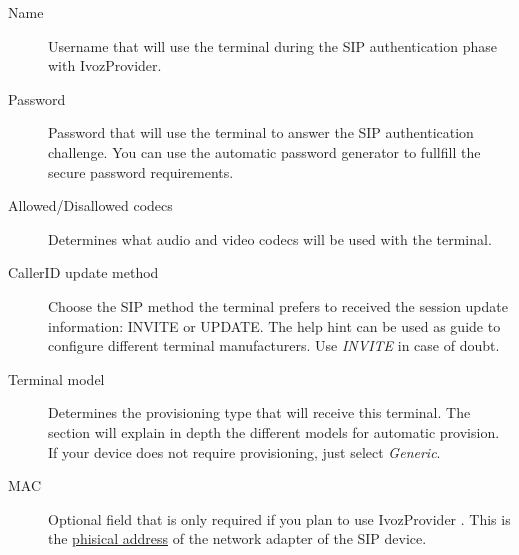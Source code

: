 \documentclass[letterpaper,10pt,english]{sphinxmanual}
\begin{document}
\noindent{}
\begin{description}
\item[{Name}] \leavevmode{}\label{pbx_features/terminals:term-name}
Username that will use the terminal during the SIP authentication phase
with IvozProvider.

\item[{Password}] \leavevmode{}\label{pbx_features/terminals:term-password}
Password that will use the terminal to answer the SIP authentication
challenge. You can use the automatic password generator to fullfill the
secure password requirements.

\item[{Allowed/Disallowed codecs}] \leavevmode{}\label{pbx_features/terminals:term-allowed-disallowed-codecs}
Determines what audio and video codecs will be used with the terminal.

\item[{CallerID update method}] \leavevmode{}\label{pbx_features/terminals:term-callerid-update-method}
Choose the SIP method the terminal prefers to received the session
update information: INVITE or UPDATE. The help hint can be used as
guide to configure different terminal manufacturers. Use \emph{INVITE} in
case of doubt.

\item[{Terminal model}] \leavevmode{}\label{pbx_features/terminals:term-terminal-model}
Determines the provisioning type that will receive this terminal.
The section {\hyperref[provisioning/index:provisioning]{}} will explain
in depth the different models for automatic provision. If your device
does not require provisioning, just select \emph{Generic}.

\item[{MAC}] \leavevmode{}\label{pbx_features/terminals:term-mac}
Optional field that is only required if you plan to use IvozProvider
{\hyperref[provisioning/index:provisioning]{}}. This is the \href{https://wikipedia.org/wiki/MAC\_Address}{phisical
address} of the network
adapter of the SIP device.

\end{description}
\end{document}
